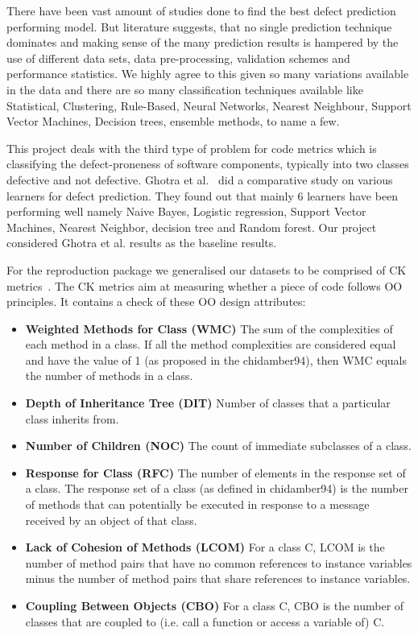 \documentclass[conference]{IEEEtran}
\begin{document}
There have been vast amount of studies done to find the best defect prediction performing model. But literature suggests, that no single prediction technique dominates and making sense of the many prediction results is hampered by the use of different data sets, data pre-processing, validation schemes and performance
statistics. We highly agree to this given so many variations available in the data and there are so many classification techniques available like Statistical, Clustering, Rule-Based, Neural Networks, Nearest Neighbour, Support Vector Machines, Decision trees, ensemble methods, to name a few.

This project deals with the third type of problem for code metrics which is classifying the defect-proneness of software components, typically into two classes defective and not defective. Ghotra et al.~\cite{ghotra2015revisiting} did a comparative study on various learners for defect prediction. They found out that mainly 6 learners have been performing well namely Naive Bayes, Logistic regression, Support Vector Machines, Nearest Neighbor, decision tree and Random forest. Our project considered Ghotra et al. results as the baseline results.

For the reproduction package we generalised our datasets to be comprised of CK metrics~\cite{chidamber1994metrics}. The CK metrics aim at measuring whether a piece of code follows OO principles. It contains a check of these OO design attributes:
\begin{itemize}
 \item {\textbf{Weighted Methods for Class (WMC)}}
 The sum of the complexities of each method in a class. If all the method complexities are considered equal and have the value of 1 (as proposed in the chidamber94), then WMC equals the number of methods in a class.
 \item {\textbf{Depth of Inheritance Tree (DIT)}}
 Number of classes that a particular class inherits from.
 \item {\textbf{Number of Children (NOC)}}
 The count of immediate subclasses of a class.
 \item {\textbf{Response for Class (RFC)}}
 The number of elements in the response set of a class. The response set of a class (as defined in chidamber94) is the number of methods that can potentially be executed in response to a message received by an object of that class.
 \item {\textbf{Lack of Cohesion of Methods (LCOM)}}
 For a class C, LCOM is the number of method pairs that have no common references to instance variables minus the number of method pairs that share references to instance variables.
 \item {\textbf{Coupling Between Objects (CBO)}}
 For a class C, CBO is the number of classes that are coupled to (i.e. call a function or access a variable of) C.
\end{itemize}
\end{document}
